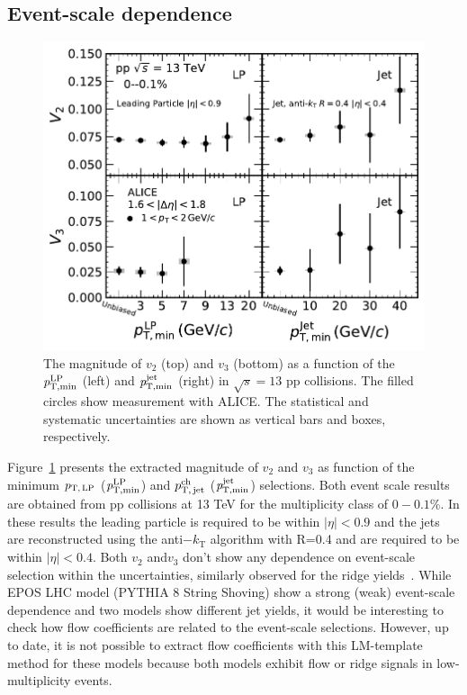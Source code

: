 \subsection{Event-scale dependence}
\begin{figure}[h!]
	\centering
	\includegraphics[width=0.6 \textwidth]{figures/Fig4_vn_LP.pdf}
	\caption{The magnitude of $v_2$ (top) and $v_3$ (bottom) as a function of the $\it{p}^{\rm{LP}}_{\rm{T,min}}$ (left) and $\it{p}^{\rm{jet}}_{\rm{T,min}}$ (right) in $\sqrt{s}=13$ pp collisions. The filled circles show measurement with ALICE. The statistical and systematic uncertainties are shown as vertical bars and boxes, respectively.}
	\label{fig:LPjet23}
\end{figure}    

Figure~\ref{fig:LPjet23} presents the extracted magnitude of $v_2$ and $v_3$ as function of the minimum $p_\mathrm{T,\,LP}$ ($\it{p}^{\rm{LP}}_{\rm{T,min}}$) and $p_\mathrm{T,\,jet}^\mathrm{ch}$ ($\it{p}^{\rm{jet}}_{\rm{T,min}}$) selections. Both event scale results are obtained from pp collisions at 13 TeV for the multiplicity class of $0-0.1\%$. In these results the leading particle is required to be within $|\eta|<0.9$ and the jets are reconstructed using the anti$-k_\mathrm{T}$ algorithm with R=0.4 and are required to be within $|\eta|<0.4$. Both $v_2$ and$v_3$ don't show any dependence on event-scale selection within the uncertainties, similarly observed for the ridge yields~\cite{ALICE:2021nir}.
While  EPOS LHC model (PYTHIA 8 String Shoving) show a strong (weak)  event-scale dependence and two models show different jet yields, it would be interesting to check how flow coefficients are related to the event-scale selections. However, up to date, it is not possible to extract flow coefficients with this LM-template method for these models because both models exhibit flow or ridge signals in low-multiplicity events.